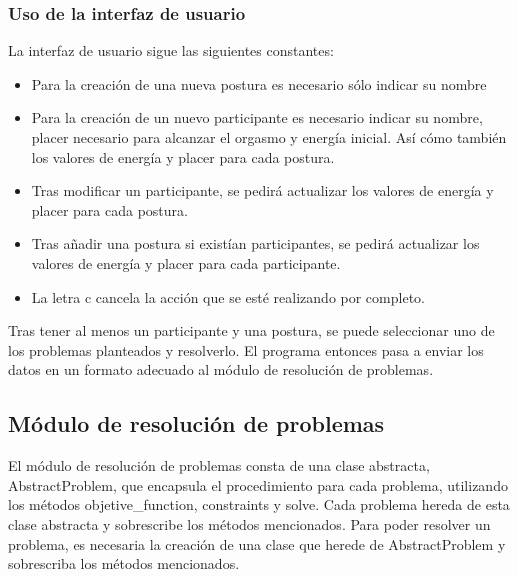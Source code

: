 \documentclass[12pt]{article}
\begin{document}
\subsubsection{Uso de la interfaz de usuario}

La interfaz de usuario sigue las siguientes constantes:

\begin{itemize}
    \item Para la creación de una nueva postura es necesario sólo indicar su nombre
    \item Para la creación de un nuevo participante es necesario indicar su nombre, placer necesario para alcanzar el orgasmo y energía inicial. Así cómo también los valores de energía y placer para cada postura.
    \item Tras modificar un participante, se pedirá actualizar los valores de energía y placer para cada postura.
    \item Tras añadir una postura si existían participantes, se pedirá actualizar los valores de energía y placer para cada participante.
    \item La letra c cancela la acción que se esté realizando por completo.
\end{itemize}

Tras tener al menos un participante y una postura, se puede seleccionar uno de los problemas planteados y resolverlo. El programa entonces pasa a enviar los datos en un formato adecuado al módulo de resolución de problemas.

\subsection{Módulo de resolución de problemas}

El módulo de resolución de problemas consta de una clase abstracta, AbstractProblem, que encapsula el procedimiento para cada problema, utilizando los métodos objetive\_function, constraints y solve. Cada problema hereda de esta clase abstracta y sobrescribe los métodos mencionados. Para poder resolver un problema, es necesaria la creación de una clase que herede de AbstractProblem y sobrescriba los métodos mencionados.
\end{document}
